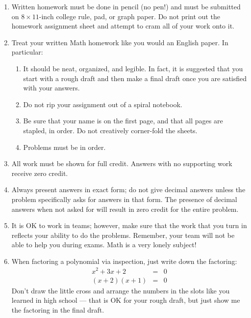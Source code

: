 \documentclass[letterpaper,12pt,fleqn]{article}
\begin{document}

\vspace{0.5in}

\begin{enumerate}
\item Written homework must be done in pencil (no pen!) and must be submitted
  on $8\times11$-inch college rule, pad, or graph paper. Do not print out the
  homework assignment sheet and attempt to cram all of your work onto it.

\item Treat your written Math homework like you would an English paper. In
  particular:
  \begin{enumerate}
  \item It should be neat, organized, and legible. In fact, it is suggested
    that you start with a rough draft and then make a final draft once you
    are satisfied with your answers.

  \item Do not rip your assignment out of a spiral notebook.
    
  \item Be sure that your name is on the first page, and that all pages are
    stapled, in order. Do not creatively corner-fold the sheets.
    
  \item Problems must be in order.
  \end{enumerate}
  
\item All work must be shown for full credit. Answers with no supporting work
  receive zero credit.

\item Always present answers in exact form; do not give decimal answers unless
  the problem specifically asks for answers in that form. The presence of decimal
  answers when not asked for will result in zero credit for the entire problem.

\item It is OK to work in teams; however, make sure that the work that you turn
  in reflects your ability to do the problems. Remember, your team will not
  be able to help you during exams. Math is a very lonely subject!

\item When factoring a polynomial via inspection, just write down the factoring:
\begin{eqnarray*}
x^2+3x+2 &=& 0 \\
(x+2)(x+1) &=& 0
\end{eqnarray*}
Don't draw the little cross and arrange the numbers in the slots like you
learned in high school --- that is OK for your rough draft, but just show me
the factoring in the final draft.


\end{enumerate}
\end{document}
